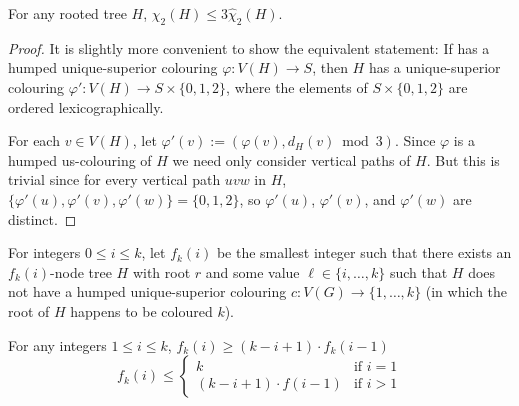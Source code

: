 \documentclass[kpfonts]{patmorin}
\newcommand{\uqs}{\chi_2}
\newcommand{\hus}{\hat{\chi}_2}
\begin{document}
\begin{lem}\label{product}
    For any rooted tree $H$, $\uqs(H)\le 3\hus(H)$.
\end{lem}

\begin{proof}
    It is slightly more convenient to show the equivalent statement: If has a humped unique-superior colouring $\varphi:V(H)\to S$, then $H$ has a unique-superior colouring $\varphi':V(H)\to S\times\{0,1,2\}$, where the elements of $S\times\{0,1,2\}$ are ordered lexicographically.

    For each $v\in V(H)$, let $\varphi'(v):=(\varphi(v), d_H(v)\bmod 3)$. Since $\varphi$ is a humped us-colouring of $H$ we need only consider vertical paths of $H$.  But this is trivial since for every vertical path $uvw$ in $H$, $\{\varphi'(u),\varphi'(v),\varphi'(w)\}=\{0,1,2\}$, so $\varphi'(u)$, $\varphi'(v)$, and $\varphi'(w)$ are distinct.
\end{proof}

For integers $0\le i\le k$, let $f_k(i)$ be the smallest integer such that there exists an $f_k(i)$-node tree $H$ with root $r$ and some value $\ell \in\{i,\ldots,k\}$ such that $H$ does not have a humped unique-superior colouring $c:V(G)\to \{1,\ldots,k\}$ (in which the root of $H$ happens to be coloured $k$).

\begin{lem}\label{recursion}
    For any integers $1\le  i\le k$, $f_k(i) \ge (k-i+1)\cdot f_k(i-1)$
    \[
        f_k(i) \le \begin{cases}
                    k & \text{if $i=1$} \\
                    (k-i+1)\cdot f(i-1) & \text{if $i>1$}
                 \end{cases}
    \]
\end{lem}
\end{document}
